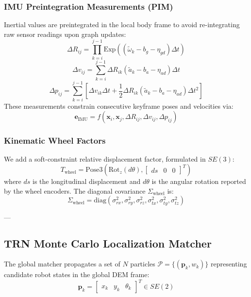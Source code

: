 \documentclass[10pt,journal,compsoc]{IEEEtran}
\begin{document}
\subsubsection{IMU Preintegration Measurements (PIM)}
Inertial values are preintegrated in the local body frame to avoid re-integrating raw sensor readings upon graph updates:
\begin{equation}
    \Delta R_{ij} = \prod_{k=i}^{j-1} \text{Exp} \left( \left( \tilde{\omega}_k - b_g - \eta_{gd} \right) \Delta t \right)
\end{equation}
\begin{equation}
    \Delta v_{ij} = \sum_{k=i}^{j-1} \Delta R_{ik} \left( \tilde{a}_k - b_a - \eta_{ad} \right) \Delta t
\end{equation}
\begin{equation}
    \Delta p_{ij} = \sum_{k=i}^{j-1} \left[ \Delta v_{ik} \Delta t + \frac{1}{2} \Delta R_{ik} \left( \tilde{a}_k - b_a - \eta_{ad} \right) \Delta t^2 \right]
\end{equation}
These measurements constrain consecutive keyframe poses and velocities via:
\begin{equation}
    \mathbf{e}_{\text{IMU}} = f(\mathbf{x}_i, \mathbf{x}_j, \Delta R_{ij}, \Delta v_{ij}, \Delta p_{ij})
\end{equation}

\subsubsection{Kinematic Wheel Factors}
We add a soft-constraint relative displacement factor, formulated in $SE(3)$:
\begin{equation}
    T_{\text{wheel}} = \text{Pose3}\left( \text{Rot}_z(d\theta), \begin{bmatrix} ds & 0 & 0 \end{bmatrix}^T \right)
\end{equation}
where $ds$ is the longitudinal displacement and $d\theta$ is the angular rotation reported by the wheel encoders. The diagonal covariance $\Sigma_{\text{wheel}}$ is:
\begin{equation}
    \Sigma_{\text{wheel}} = \text{diag}(\sigma_{rx}^2, \sigma_{ry}^2, \sigma_{rz}^2, \sigma_{tx}^2, \sigma_{ty}^2, \sigma_{tz}^2)
\end{equation}

---

\subsection{TRN Monte Carlo Localization Matcher}
The global matcher propagates a set of $N$ particles $\mathcal{P} = \{ (\mathbf{p}_k, w_k) \}$ representing candidate robot states in the global DEM frame:
\begin{equation}
    \mathbf{p}_k = \begin{bmatrix} x_k & y_k & \theta_k \end{bmatrix}^T \in SE(2)
\end{equation}
\end{document}
